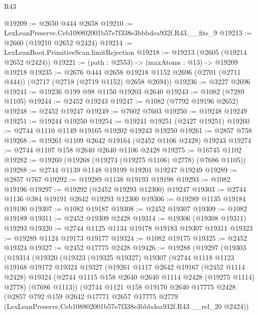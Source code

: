 \begin{lexlean}{R43}
\begin{coremodule}
@19209 := @2650 @444 @2658
@19210 := LexLeanPreserve.Ceb108802001b57e7f338e3bbbdea932f.R43.__fits_9
@19213 := @2660 (@19210 @2652 @2424)
@19214 := LexLeanBoot.PrimitiveScan.limitRejection
@19218 := @19213 (@2605 (@19214 @2652 @2424))
@19221 := (path : @2553) -> (maxAtoms : @13) -> @19209 @19218
@19235 := @2676
    @444
    @2658
    @19218
    @1152
    @2696
    (@2701 (@2711 @444))
    (@2717 (@2718 (@2719 @1152) @2658 @2694))
@19236 := @3227 @2696
@19241 := @19236 @199 @98 @1150 @19203 @2640
@19243 := @1082 (@7289 @1105)
@19244 := @2452 @19243
@19247 := @1082 (@7792 @19196 @2652)
@19248 := @2452 @19247
@19249 := @7602 @7603
@19250 := @19248 @19249
@19251 := @19244 @19250
@19254 := @19241 @19251 (@2427 @19251)
@19260 := @2744 @1110 @1149 @19165 @19202 @19243 @19250
@19261 := @2857 @758
@19268 := @19261 @1109 @2642 @19164 (@2452 @1106 @2428) @19243
@19274 := @2744 @1107 @158 @2640 @2640 @1106 @2428
@19275 := @16745 @1102
@19282 := @19260 (@19268 (@19274 (@19275 @1106) @2778) (@7686 @1105))
@19288 := @2744 @1139 @1148 @19199 @19201 @19247 @19249
@19289 := @2857 @767
@19292 := @19289 @1138 @19193 @19198
@19293 := @1082 @19196
@19297 := @19292 (@2452 @19293 @12300) @19247
@19303 := @2744 @1136 @384 @19191 @2642 @19293 @12300
@19306 := @19289 @1135 @19184 @19190
@19307 := @1082 @19187
@19308 := @2452 @19307
@19309 := @1082 @19189
@19311 := @2452 @19309 @2428
@19314 := @19306 (@19308 @19311) @19293
@19320 := @2744 @1125 @1134 @19178 @19183 @19307 @19311
@19323 := @19289 @1124 @19173 @19177
@19324 := @1082 @19175
@19325 := @2452 @19324
@19327 := @2452 @17775 @2428
@19426 := @19288
    (@19297
      (@19303
        (@19314
          (@19320
            (@19323
              (@19325 @19327)
              @19307
              (@2744
                @1118
                @1123
                @19168
                @19172
                @19324
                @19327
                (@19261
                  @1117
                  @2642
                  @19167
                  (@2452 @1114 @2428)
                  @19324
                  (@2744 @1115 @158 @2640 @2640 @1114 @2428 (@19275 @1114) @2778)
                  (@7686 @1113))
                (@2744
                  @1121
                  @158
                  @19170
                  @2640
                  @17775
                  @2428
                  (@2857
                    @792
                    @159
                    @2642
                    @17771
                    @2657
                    @17775
                    @2779
                    (LexLeanPreserve.Ceb108802001b57e7f338e3bbbdea932f.R43.__rel_20 @2424))

\end{coremodule}
\end{lexlean}

